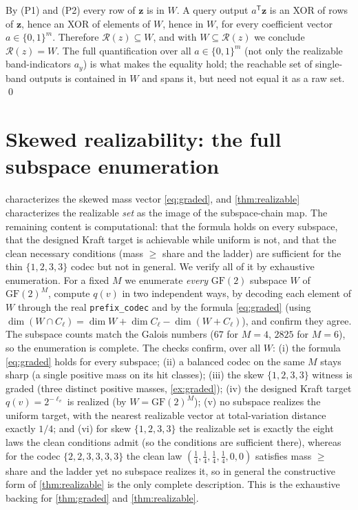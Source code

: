 \documentclass[sigconf,nonacm,anonymous,balance=false]{acmart}
\newcommand{\B}{\{0,1\}}
\newcommand{\GF}{\mathrm{GF}(2)}
\newcommand{\W}{W}                          %
\newcommand{\Rz}{\mathcal{R}(z)}            %
\newcommand{\bz}{\mathbf{z}}                %
\newcommand{\ay}{a_y}                       %
\newcommand{\inter}{\cap}
\begin{document}
By (P1) and (P2) every row of $\bz$ is in $\W$. A query output $a^{\mathsf T}\bz$ is an XOR of rows
of $\bz$, hence an XOR of elements of $\W$, hence in $\W$, for every coefficient vector
$a \in \B^m$. Therefore $\Rz \subseteq \W$, and with $\W \subseteq \Rz$ we conclude $\Rz = \W$. The
full quantification over all $a \in \B^m$ (not only the realizable band-indicators $\ay$) is what
makes the equality hold; the reachable set of single-band outputs is contained in $\W$ and spans it,
but need not equal it as a raw set. \qed

\section{Skewed realizability: the full subspace enumeration}
\label{app:skewed}

 characterizes the skewed mass vector \eqref{eq:graded}, and
\cref{thm:realizable} characterizes the realizable \emph{set} as the image of the
subspace-chain map. The remaining content is computational: that the formula holds on every
subspace, that the designed Kraft target is achievable while uniform is not, and that the clean
necessary conditions (mass $\ge$ share and the ladder) are sufficient for the thin
$\{1,2,3,3\}$ codec but not in general. We verify all of it by exhaustive enumeration. For a fixed $M$ we enumerate \emph{every} $\GF$ subspace $\W$ of $\GF^M$, compute
$q(v)$ in two independent ways, by decoding each element of $\W$ through the real
\texttt{prefix\_codec} and by the formula \eqref{eq:graded} (using $\dim(\W \inter C_\ell) =
\dim \W + \dim C_\ell - \dim(\W + C_\ell)$), and confirm they agree. The subspace counts match
the Galois numbers ($67$ for $M = 4$, $2825$ for $M = 6$), so the enumeration is complete. The
checks confirm, over all $\W$: (i) the formula \eqref{eq:graded} holds for every subspace; (ii)
a balanced codec on the same $M$ stays sharp (a single positive mass on its hit classes); (iii)
the skew $\{1,2,3,3\}$ witness is graded (three distinct positive masses, \cref{ex:graded});
(iv) the designed Kraft target $q(v) = 2^{-\ell_v}$ is realized (by $\W = \GF^M$); (v) no
subspace realizes the uniform target, with the nearest realizable vector at total-variation
distance exactly $1/4$; and (vi) for skew $\{1,2,3,3\}$ the realizable set is exactly the eight
laws the clean conditions admit (so the conditions are sufficient there), whereas for the codec
$\{2,2,3,3,3,3\}$ the clean law $(\tfrac14,\tfrac14,\tfrac14,\tfrac14,0,0)$ satisfies mass
$\ge$ share and the ladder yet no subspace realizes it, so in general the constructive
form of \cref{thm:realizable} is the only complete description. This is the exhaustive backing
for \cref{thm:graded} and \cref{thm:realizable}.
\end{document}
